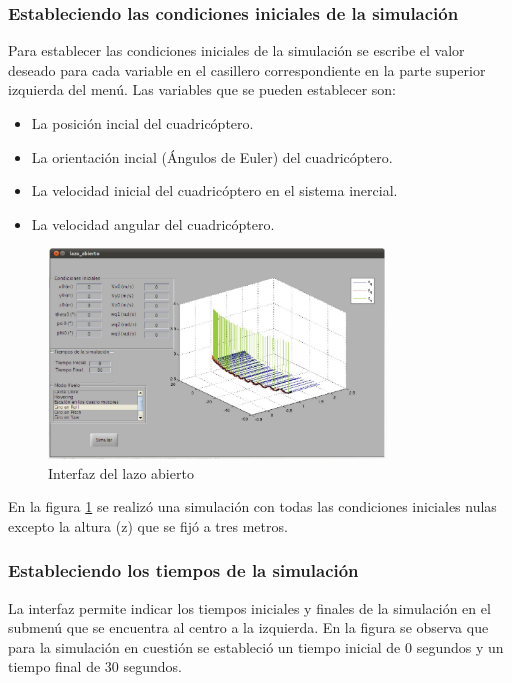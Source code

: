 \documentclass[main]{subfiles}
\begin{document}
\subsubsection*{Estableciendo las condiciones iniciales de la simulaci\'on}
Para establecer las condiciones iniciales de la simulaci\'on se escribe el valor deseado para cada variable en el casillero correspondiente en la parte superior izquierda del men\'u. Las variables que se pueden establecer son:
\begin{itemize}
\item La posici\'on incial del cuadric\'optero.
\item La orientaci\'on incial (\'Angulos de Euler) del cuadric\'optero.
\item La velocidad inicial del cuadric\'optero en el sistema inercial.
\item La velocidad angular del cuadric\'optero.
\end{itemize}
\begin{figure}
\centering
  \includegraphics[width=0.8\textwidth]{./pics_anexo_simulador/anexo:lazo_abierto.pdf}
\caption{Interfaz del lazo abierto}
\vspace{-20pt}
\label{fig:anexo:lazo_abierto}
\end{figure}

En la figura \ref{fig:anexo:lazo_abierto} se realiz\'o una simulaci\'on con todas las condiciones iniciales nulas excepto la altura (z) que se fij\'o a tres metros.
\subsubsection*{Estableciendo los tiempos de la simulaci\'on}
La interfaz permite indicar los tiempos iniciales y finales de la simulaci\'on en el submen\'u que se encuentra al centro a la izquierda. En la figura se observa que para la simulaci\'on en cuesti\'on se estableci\'o un tiempo inicial de 0 segundos y un tiempo final de 30 segundos.
\end{document}
